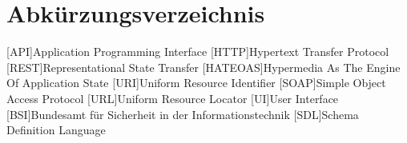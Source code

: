 \chapter{Abkürzungsverzeichnis}

\begin{acronym}
[API]{Application Programming Interface}
[HTTP]{Hypertext Transfer Protocol}
[REST]{Representational State Transfer}
[HATEOAS]{Hypermedia As The Engine Of Application State}
[URI]{Uniform Resource Identifier}
[SOAP]{Simple Object Access Protocol}
[URL]{Uniform Resource Locator}
[UI]{User Interface}
[BSI]{Bundesamt für Sicherheit in der Informationstechnik}
[SDL]{Schema Definition Language}
\end{acronym}